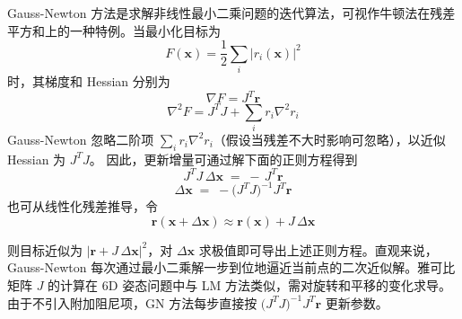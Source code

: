 Gauss-Newton 方法是求解非线性最小二乘问题的迭代算法，可视作牛顿法在残差平方和上的一种特例。当最小化目标为 
\begin{equation}
	F(\mathbf{x})=\frac{1}{2}\sum_i \bigl\lvert r_i(\mathbf{x})\bigr\rvert^2
\end{equation}
时，其梯度和 Hessian 分别为 
\begin{equation}
	\nabla F = J^T \mathbf{r}
\end{equation}
\begin{equation}
	\nabla^2 F = J^T J + \sum_i r_i \nabla^2 r_i
\end{equation}
Gauss-Newton 忽略二阶项 \(\sum_i r_i \nabla^2 r_i\)（假设当残差不大时影响可忽略），以近似 Hessian 为 \(J^T J\)。
因此，更新增量可通过解下面的正则方程得到
\begin{equation}
	J^T J \,\Delta \mathbf{x} \;=\; -\,J^T \mathbf{r}
\end{equation}
\begin{equation}
	\Delta \mathbf{x} \;=\; -\bigl(J^T J\bigr)^{-1} J^T \mathbf{r}
\end{equation}
也可从线性化残差推导，令 
\begin{equation}
	\mathbf{r}(\mathbf{x} + \Delta \mathbf{x}) \approx \mathbf{r}(\mathbf{x}) + J\,\Delta \mathbf{x}
\end{equation}

则目标近似为 \(\bigl\lvert \mathbf{r} + J\,\Delta \mathbf{x}\bigr\rvert^2\)，对 \(\Delta \mathbf{x}\) 求极值即可导出上述正则方程。直观来说，Gauss-Newton 每次通过最小二乘解一步到位地逼近当前点的二次近似解。雅可比矩阵 \(J\) 的计算在 6D 姿态问题中与 LM 方法类似，需对旋转和平移的变化求导。由于不引入附加阻尼项，GN 方法每步直接按 \(\bigl(J^T J\bigr)^{-1} J^T \mathbf{r}\) 更新参数。


